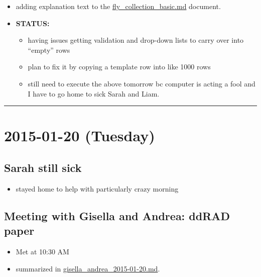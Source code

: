 \documentclass[letterpaper]{scrartcl}
\begin{document}
\begin{itemize}
\item
  adding explanation text to the
  \href{file:///home/gus/Dropbox/repos/git/markdown-docs/protocols/fly_collection_basic/fly_collection_basic.md}{fly\_collection\_basic.md}
  document.
\item
  \textbf{STATUS:}

  \begin{itemize}
  \itemsep1pt\parskip0pt
  \item
    having issues getting validation and drop-down lists to carry over
    into ``empty'' rows
  \item
    plan to fix it by copying a template row into like 1000 rows
  \item
    still need to execute the above tomorrow bc computer is acting a
    fool and I have to go home to sick Sarah and Liam.
  \end{itemize}
\end{itemize}

\begin{center}\rule{0.5\linewidth}{\linethickness}\end{center}

\section{2015-01-20 (Tuesday)}\label{tuesday-2}

\subsection{Sarah still sick}\label{sarah-still-sick}

\begin{itemize}
\itemsep1pt\parskip0pt
\item
  stayed home to help with particularly crazy morning
\end{itemize}

\subsection{Meeting with Gisella and Andrea: ddRAD
paper}\label{meeting-with-gisella-and-andrea-ddrad-paper}

\begin{itemize}
\itemsep1pt\parskip0pt
\item
  Met at 10:30 AM
\item
  summarized in
  \href{file:///home/gus/Dropbox/repos/git/markdown-docs/notes/meetings/gisella_andrea_2015-01-20/gisella_andrea_2015-01-20.md}{gisella\_andrea\_2015-01-20.md}.
\end{itemize}
\end{document}

